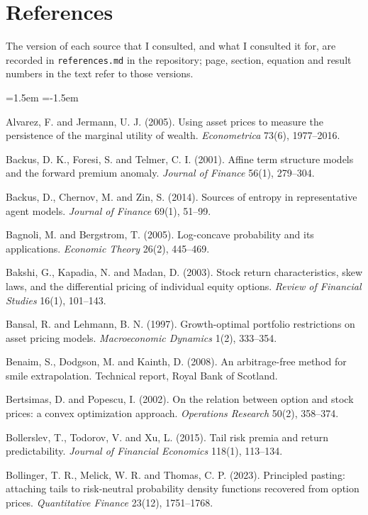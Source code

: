 \documentclass[11pt]{article}
\theoremstyle{remark}
\begin{document}
\section*{References}
The version of each source that I consulted, and what I consulted it for, are recorded in \texttt{references.md} in the repository; page, section, equation and result numbers in the text refer to those versions.

\smallskip
\begin{list}{}{\leftmargin=1.5em \itemindent=-1.5em \itemsep=2pt \parsep=0pt}\small

\item Alvarez, F. and Jermann, U. J. (2005). Using asset prices to measure the persistence of the marginal utility of wealth. \emph{Econometrica} 73(6), 1977--2016.
\item Backus, D. K., Foresi, S. and Telmer, C. I. (2001). Affine term structure models and the forward premium anomaly. \emph{Journal of Finance} 56(1), 279--304.
\item Backus, D., Chernov, M. and Zin, S. (2014). Sources of entropy in representative agent models. \emph{Journal of Finance} 69(1), 51--99.
\item Bagnoli, M. and Bergstrom, T. (2005). Log-concave probability and its applications. \emph{Economic Theory} 26(2), 445--469.
\item Bakshi, G., Kapadia, N. and Madan, D. (2003). Stock return characteristics, skew laws, and the differential pricing of individual equity options. \emph{Review of Financial Studies} 16(1), 101--143.
\item Bansal, R. and Lehmann, B. N. (1997). Growth-optimal portfolio restrictions on asset pricing models. \emph{Macroeconomic Dynamics} 1(2), 333--354.
\item Benaim, S., Dodgson, M. and Kainth, D. (2008). An arbitrage-free method for smile extrapolation. Technical report, Royal Bank of Scotland.
\item Bertsimas, D. and Popescu, I. (2002). On the relation between option and stock prices: a convex optimization approach. \emph{Operations Research} 50(2), 358--374.
\item Bollerslev, T., Todorov, V. and Xu, L. (2015). Tail risk premia and return predictability. \emph{Journal of Financial Economics} 118(1), 113--134.
\item Bollinger, T. R., Melick, W. R. and Thomas, C. P. (2023). Principled pasting: attaching tails to risk-neutral probability density functions recovered from option prices. \emph{Quantitative Finance} 23(12), 1751--1768.

\end{list}
\end{document}
